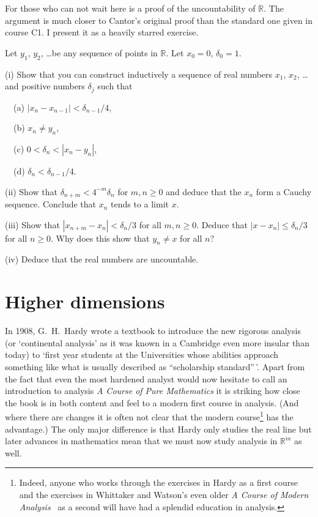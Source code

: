For those who can not wait here is a proof of the
uncountability of ${\mathbb R}$. The argument is
much closer to Cantor's original proof than the
standard one given in course C1. I present
it as a heavily starred exercise.
\begin{exercise}%
\label{Cantor}
Let $y_{1}$, $y_{2}$, \dots be any
sequence of points in ${\mathbb R}$. Let $x_{0}=0$,
$\delta_{0}=1$.

(i) Show that you can construct inductively
a sequence of real numbers $x_{1}$, $x_{2}$, \dots
and positive numbers $\delta_{j}$ such that

\ \ (a) $|x_{n}-x_{n-1}|<\delta_{n-1}/4$,

\ \ (b) $x_{n}\neq y_{n}$,

\ \ (c) $0<\delta_{n}<|x_{n}-y_{n}|$,

\ \ (d) $\delta_{n}<\delta_{n-1}/4$.

(ii) Show that $\delta_{n+m}<4^{-m}\delta_{n}$ for $m,n\geq 0$
and deduce that the $x_{n}$ form a Cauchy sequence.
Conclude that $x_{n}$ tends to a limit $x$.

(iii) Show that $|x_{n+m}-x_{n}|<\delta_{n}/3$ for all 
$m,n\geq 0$. Deduce that $|x-x_{n}|\leq \delta_{n}/3$
for all $n\geq 0$. Why does this show that $y_{n}\neq x$
for all $n$?

(iv) Deduce that the real numbers are uncountable.
\end{exercise}

\section{Higher dimensions} In 1908, G.~H.~Hardy wrote
a textbook to introduce the new rigorous
analysis (or `continental analysis' as it was known
in a Cambridge even more insular than today)
to `first year students at the Universities
whose abilities approach something like what is
usually described as ``scholarship standard''\,'.
Apart from the fact that even the most hardened
analyst would now hesitate to call an introduction
to analysis  \emph{A Course of Pure Mathematics}
it is striking how close the book is in both
content and feel to a modern first course in
analysis. (And where there are changes it is
often not clear that the modern course\footnote{Indeed,
anyone who works through the exercises in Hardy
as a first course and the exercises in Whittaker
and Watson's even older 
\emph{A Course of Modern Analysis}~\cite{Whittaker}
as a second will have had a splendid education in analysis.}  
has the advantage.)
The only major difference is that Hardy only
studies the real line but later advances in mathematics
mean that we must now study analysis in ${\mathbb R}^{m}$
as well.


